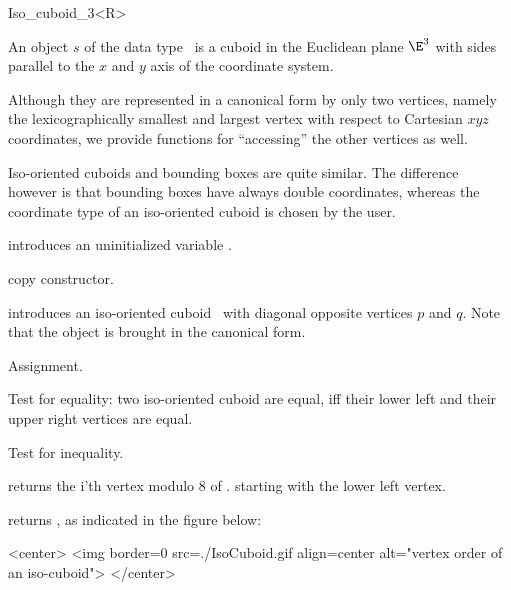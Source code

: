 \begin{ccRefClass} {Iso_cuboid_3<R>}

\ccDefinition  An object $s$ of the data type \ccRefName\ is a
cuboid in the Euclidean plane $\E^3$ with sides parallel to the $x$ and
$y$ axis of the coordinate system.
 
Although they are represented in a canonical form by only two
vertices, namely the lexicographically smallest and largest vertex
with respect to Cartesian $xyz$ coordinates, we provide
functions for ``accessing'' the other vertices as well.

Iso-oriented cuboids and bounding boxes are quite similar. The
difference however is that bounding boxes have always double coordinates, 
whereas the coordinate type of an iso-oriented cuboid is chosen by
the user.


\ccCreation
{}


\ccHidden {}
             {introduces an uninitialized variable \ccVar.}

\ccHidden {}
 	    {copy constructor.}

            {introduces an iso-oriented cuboid \ccVar\ with diagonal
             opposite vertices $p$ and $q$. Note that the object is 
             brought in the canonical form.}


\ccOperations
\ccHidden {}
        {Assignment.}

       {Test for equality: two iso-oriented cuboid are equal, iff their
        lower left and their upper right vertices are equal.}

       {Test for inequality.}

       {returns the i'th vertex modulo 8  of \ccVar.
        starting with the lower left vertex.}

       {returns  , as indicated in the figure below:
       }

\begin{ccHtmlOnly}
<center>
<img border=0 src=./IsoCuboid.gif align=center alt="vertex order of an iso-cuboid">
</center>
\end{ccHtmlOnly} 



\end{ccRefClass}
